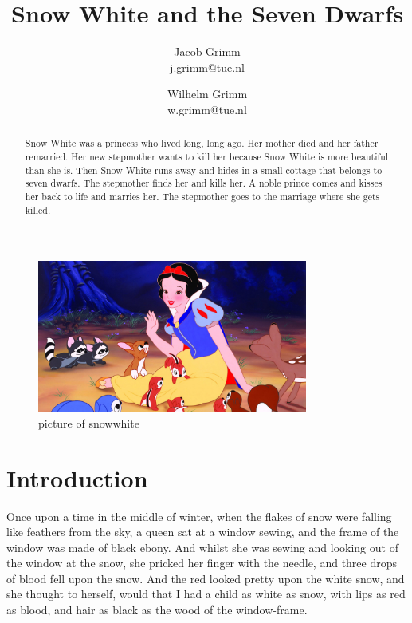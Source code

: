 \documentclass[a4paper,11pt]{article}
\begin{document}
\title{Snow White and the Seven Dwarfs}
\author{Jacob Grimm\\j.grimm@tue.nl \and Wilhelm Grimm\\w.grimm@tue.nl}
\date{}
\maketitle

\begin{figure}[!ht]
\begin{center}
\includegraphics[bb=0 0 250 327,height=5cm]{snowwhite.jpg}
\caption{picture of snowwhite}
\label{fig:snowwhite}
\end{center}
\end{figure}

\begin{abstract}
\noindent
Snow White was a princess who lived long, long ago. Her mother died
and her father remarried. Her new stepmother wants to kill her because
Snow White is more beautiful than she is. Then Snow White runs away and
hides in a small cottage that belongs to seven dwarfs. The stepmother
finds her and kills her. A noble prince comes and kisses her back to
life and marries her. The stepmother goes to the marriage where she gets killed.
\end{abstract}


\tableofcontents
\section{Introduction}

Once upon a time in the middle of winter, when the flakes of
snow were falling like feathers from the sky, a queen sat at
a window sewing, and the frame of the window was made of black
ebony.  And whilst she was sewing and looking out of the window
at the snow, she pricked her finger with the needle, and three
drops of blood fell upon the snow.  And the red looked pretty
upon the white snow, and she thought to herself, would that I had
a child as white as snow, with lips as red as blood, and hair as black as the
wood of the window-frame.
\end{document}
